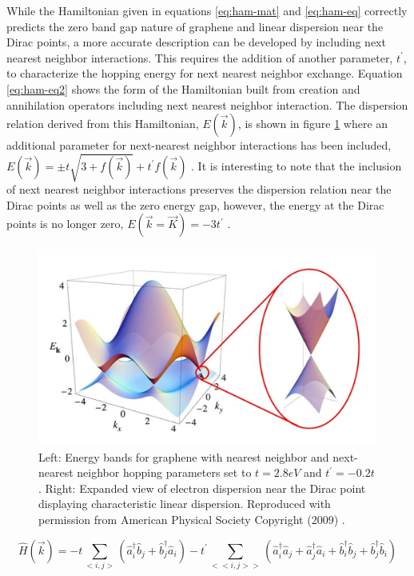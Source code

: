  While the Hamiltonian given in equations \ref{eq:ham-mat} and \ref{eq:ham-eq} correctly predicts the zero band gap nature of graphene and  linear dispersion near the Dirac points, a more accurate description can be developed by including next nearest neighbor interactions. This requires the addition of another parameter, $t^{'}$, to characterize the hopping energy for next nearest neighbor exchange. Equation \ref{eq:ham-eq2} shows the form of the Hamiltonian built from creation and annihilation operators including next nearest neighbor interaction. The dispersion relation derived from this Hamiltonian, $E(\vec{k})$, is shown in figure \ref{fig:dispersion} where an additional parameter for next-nearest neighbor interactions has been included, $E(\vec{k}) = \pm t \sqrt{3 + f(\vec{k})} + t^{'}f(\vec{k})$ \cite{geim-elec}. It is interesting to note that the inclusion of next nearest neighbor interactions preserves the dispersion relation near the Dirac points as well as the zero energy gap, however, the energy at the Dirac points is no longer zero, $E(\vec{k}=\vec{K}) = -3t^{'}$ \cite{geim-elec}.

 \begin{figure}
 \centering
         \includegraphics[scale=0.40]{figs/Graphene-Dispersion.png}
    \caption{Left: Energy bands for graphene with nearest neighbor and next-nearest neighbor hopping parameters set to $t=2.8 eV$ and $t^{'}=-0.2t$. Right: Expanded view of electron dispersion near the Dirac point displaying characteristic linear dispersion. Reproduced with permission from American Physical Society Copyright (2009) \cite{geim-elec}.
    }
    \label{fig:dispersion}
\end{figure}

\begin{equation}
\label{eq:ham-eq2}
\hat{H}(\vec{k}) = -t \sum_{<i,j>}( \hat{a}_{i}^{\dagger} \hat{b}_{j} + \hat{b}_{j}^{\dagger} \hat{a}_{i} )  -t^{'}\sum_{<<i,j>>}(\hat{a}_{i}^{\dagger} \hat{a}_{j} + \hat{a}_{j}^{\dagger} \hat{a}_{i} + \hat{b}_{i}^{\dagger} \hat{b}_{j} + \hat{b}_{j}^{\dagger} \hat{b}_{i} )
\end{equation}

